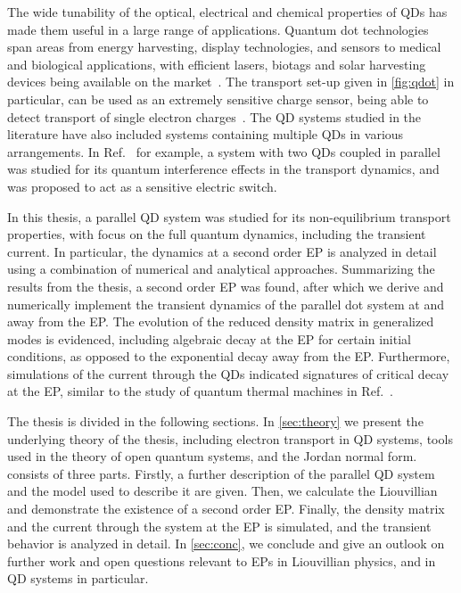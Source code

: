 \documentclass[../main.tex]{subfiles}
\begin{document}
The wide tunability of the optical, electrical and chemical properties of QDs has made them useful in a large range of applications. Quantum dot technologies span areas from energy harvesting, display technologies, and sensors to medical and biological applications, with efficient lasers, biotags and solar harvesting devices being available on the market~\cite{qdotrev}. The transport set-up given in \cref{fig:qdot} in particular, can be used as an extremely sensitive charge sensor, being able to detect transport of single electron charges~\cite{etrans}. The QD systems studied in the literature have also included systems containing multiple QDs in various arrangements. In Ref.~\cite{doubledot} for example, a system with two QDs coupled in parallel was studied for its quantum interference effects in the transport dynamics, and was proposed to act as a sensitive electric switch.

In this thesis, a parallel QD system was studied for its non-equilibrium transport properties, with focus on the full quantum dynamics, including the transient current. In particular, the dynamics at a second order EP is analyzed in detail using a combination of numerical and analytical approaches. Summarizing the results from the thesis, a second order EP was found, after which we derive and numerically implement the transient dynamics of the parallel dot system at and away from the EP. The evolution of the reduced density matrix in generalized modes is evidenced, including algebraic decay at the EP for certain initial conditions, as opposed to the exponential decay away from the EP. Furthermore, simulations of the current through the QDs indicated signatures of critical decay at the EP, similar to the study of quantum thermal machines in Ref.~\cite{thermal}.



The thesis is divided in the following sections. In \cref{sec:theory} we present the underlying theory of the thesis, including electron transport in QD systems, tools used in the theory of open quantum systems, and the Jordan normal form.  consists of three parts. Firstly, a further description of the parallel QD system and the model used to describe it are given. Then, we calculate the Liouvillian and demonstrate the existence of a second order EP. Finally, the density matrix and the current through the system at the EP is simulated, and the transient behavior is analyzed in detail. In \cref{sec:conc}, we conclude and give an outlook on further work and open questions relevant to EPs in Liouvillian physics, and in QD systems in particular.
\end{document}
